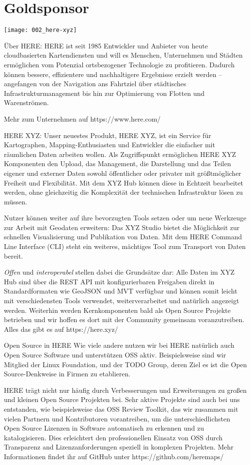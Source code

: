 \section*{Goldsponsor}
\begin{center}
  \texttt{[image: 002\_here-xyz]}
\end{center}
Über HERE: HERE ist seit 1985 Entwickler und Anbieter von heute cloudbasierten Kartendiensten und will es Menschen, Unternehmen und Städten ermöglichen vom Potenzial ortsbezogener Technologie zu profitieren. Dadurch können bessere, effizientere und nachhaltigere Ergebnisse erzielt werden – angefangen von der Navigation ans Fahrtziel über städtisches Infrastrukturmanagement bis hin zur Optimierung von Flotten und Warenströmen.

Mehr zum Unternehmen auf https://www.here.com/

HERE XYZ: Unser neuestes Produkt, HERE XYZ, ist ein Service für Kartographen, Mapping-Enthusiasten und Entwickler die einfacher mit räumlichen Daten arbeiten wollen. Als Zugriffspunkt ermöglichen HERE XYZ Komponenten den Upload, das Management, die Darstellung und das Teilen eigener und externer Daten sowohl öffentlicher oder privater mit größtmöglicher Freiheit und Flexibilität. Mit dem XYZ Hub können diese in Echtzeit bearbeitet werden, ohne gleichzeitig die Komplexität der technischen Infrastruktur lösen zu müssen.

Nutzer können weiter auf ihre bevorzugten Tools setzen oder um neue Werkzeuge zur Arbeit mit Geodaten erweitern: Das XYZ Studio bietet die Möglichkeit zur schnellen Visualisierung und Publikation von Daten. Mit dem HERE Command Line Interface (CLI) steht ein weiteres, mächtiges Tool zum Transport von Daten bereit.

\emph{Offen} und \emph{interoperabel} stellen dabei die Grundsätze dar: Alle Daten im XYZ Hub sind über die REST API mit konfigurierbaren Freigaben direkt in Standardformaten wie GeoJSON und MVT verfügbar und können somit leicht mit verschiedensten Tools verwendet, weiterverarbeitet und natürlich angezeigt werden. Weiterhin werden Kernkomponenten bald als Open Source Projekte betrieben und wir hoffen es dort mit der Community gemeinsam voranzutreiben. Alles das gibt es auf https://here.xyz/

Open Source in HERE Wie viele andere nutzen wir bei HERE natürlich auch Open Source Software und unterstützen OSS aktiv. Beispielsweise sind wir Mitglied der Linux Foundation, und der TODO Group, deren Ziel es ist die Open Source-Denkweise in Firmen zu etablieren.

HERE trägt nicht nur häufig durch Verbesserungen und Erweiterungen zu großen und kleinen Open Source Projekten bei. Sehr aktive Projekte sind auch bei uns entstanden, wie beispielsweise das OSS Review Toolkit, das wir zusammen mit vielen Partnern und Kontributoren vorantreiben, um die unterschiedlichsten Open Source Lizenzen in Software automatisch zu erkennen und zu katalogisieren. Dies erleichtert den professionellen Einsatz von OSS durch Transparenz and Lizenzanforderungen speziell in komplexen Projekten. Mehr Informationen findet ihr auf GitHub unter https://github.com/heremaps/
